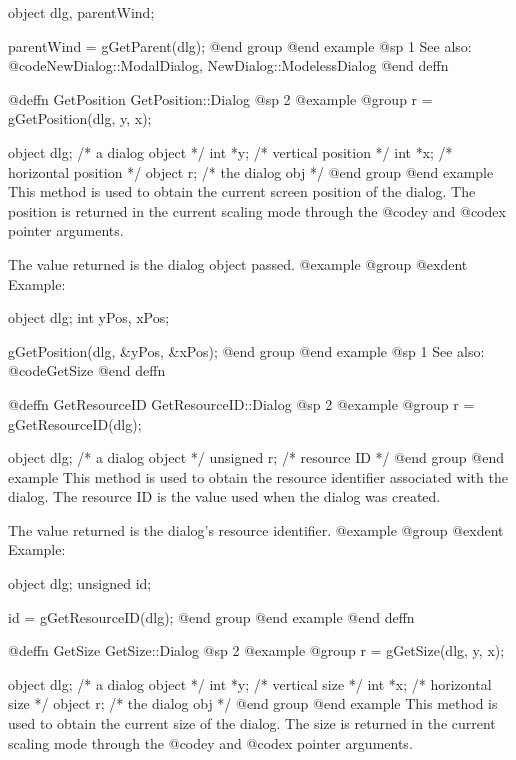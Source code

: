 object  dlg, parentWind;

parentWind = gGetParent(dlg);
@end group
@end example
@sp 1
See also:  @code{NewDialog::ModalDialog, NewDialog::ModelessDialog}
@end deffn















@deffn {GetPosition} GetPosition::Dialog
@sp 2
@example
@group
r = gGetPosition(dlg, y, x);

object  dlg;   /*  a dialog object     */
int     *y;    /*  vertical position   */
int     *x;    /*  horizontal position */
object  r;     /*  the dialog obj      */
@end group
@end example
This method is used to obtain the current screen position of the dialog.
The position is returned in the current scaling mode through the
@code{y} and @code{x} pointer arguments.

The value returned is the dialog object passed.
@example
@group
@exdent Example:

object  dlg;
int     yPos, xPos;

gGetPosition(dlg, &yPos, &xPos);
@end group
@end example
@sp 1
See also:  @code{GetSize}
@end deffn




@deffn {GetResourceID} GetResourceID::Dialog
@sp 2
@example
@group
r = gGetResourceID(dlg);

object    dlg;   /*  a dialog object   */
unsigned  r;     /*  resource ID       */
@end group
@end example
This method is used to obtain the resource identifier associated with the
dialog.  The resource ID is the value used when the dialog was created.

The value returned is the dialog's resource identifier.
@example
@group
@exdent Example:

object    dlg;
unsigned  id;

id = gGetResourceID(dlg);
@end group
@end example
@end deffn




@deffn {GetSize} GetSize::Dialog
@sp 2
@example
@group
r = gGetSize(dlg, y, x);

object  dlg;   /*  a dialog object   */
int     *y;    /*  vertical size     */
int     *x;    /*  horizontal size   */
object  r;     /*  the dialog obj    */
@end group
@end example
This method is used to obtain the current size of the dialog.
The size is returned in the current scaling mode through the
@code{y} and @code{x} pointer arguments.

